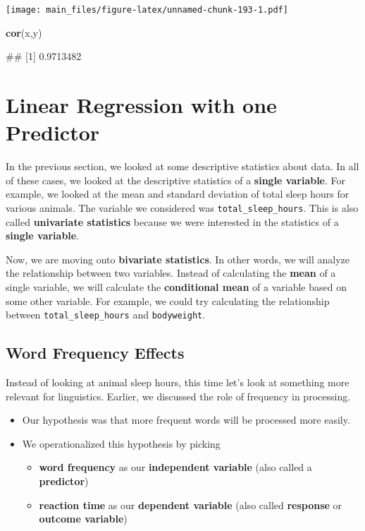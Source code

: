 \documentclass[
]{book}
\newenvironment{Shaded}{\begin{snugshade}}{\end{snugshade}}
\newcommand{\FunctionTok}[1]{\textcolor[rgb]{0.13,0.29,0.53}{\textbf{#1}}}
\newcommand{\NormalTok}[1]{#1}
\providecommand{\tightlist}{%
  \setlength{\itemsep}{0pt}\setlength{\parskip}{0pt}}
\begin{document}
\texttt{[image: main\_files/figure-latex/unnamed-chunk-193-1.pdf]}

\begin{Shaded}
\begin{Highlighting}[]
\FunctionTok{cor}\NormalTok{(x,y)}
\end{Highlighting}
\end{Shaded}

\begin{Shaded}
\begin{Highlighting}[]
\NormalTok{\#\# [1] 0.9713482}
\end{Highlighting}
\end{Shaded}

\hypertarget{linear-regression-with-one-predictor}{%
\chapter{Linear Regression with one Predictor}\label{linear-regression-with-one-predictor}}

In the previous section, we looked at some descriptive statistics about data. In all of these cases, we looked at the descriptive statistics of a \textbf{single variable}. For example, we looked at the mean and standard deviation of total sleep hours for various animals. The variable we considered was \texttt{total\_sleep\_hours}. This is also called \textbf{univariate statistics} because we were interested in the statistics of a \textbf{single variable}.

Now, we are moving onto \textbf{bivariate statistics}. In other words, we will analyze the relationship between two variables. Instead of calculating the \textbf{mean} of a single variable, we will calculate the \textbf{conditional mean} of a variable based on some other variable. For example, we could try calculating the relationship between \texttt{total\_sleep\_hours} and \texttt{bodyweight}.

\hypertarget{word-frequency-effects}{%
\section{Word Frequency Effects}\label{word-frequency-effects}}

Instead of looking at animal sleep hours, this time let's look at something more relevant for linguistics. Earlier, we discussed the role of frequency in processing.

\begin{itemize}
\tightlist
\item
  Our hypothesis was that more frequent words will be processed more easily.
\item
  We operationalized this hypothesis by picking

  \begin{itemize}
  \tightlist
  \item
    \textbf{word frequency} as our \textbf{independent variable} (also called a \textbf{predictor})
  \item
    \textbf{reaction time} as our \textbf{dependent variable} (also called \textbf{response} or \textbf{outcome variable})
  \end{itemize}
\end{itemize}
\end{document}
